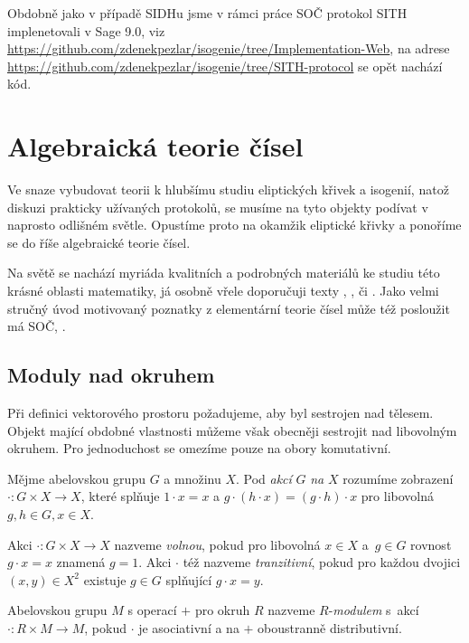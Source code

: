 \documentclass[12pt]{report}
\begin{document}
Obdobně jako v případě SIDHu jsme v rámci práce SOČ protokol SITH implenetovali v Sage 9.0, viz \url{https://github.com/zdenekpezlar/isogenie/tree/Implementation-Web}, na adrese \url{https://github.com/zdenekpezlar/isogenie/tree/SITH-protocol} se opět nachází kód.


\chapter{Algebraická teorie čísel}

Ve snaze vybudovat teorii k hlubšímu studiu eliptických křivek a isogenií, natož diskuzi prakticky užívaných protokolů, se musíme na tyto objekty podívat v naprosto odlišném světle. Opustíme proto na okamžik eliptické křivky a ponoříme se do říše algebraické teorie čísel.

Na světě se nachází myriáda kvalitních a podrobných materiálů ke studiu této krásné oblasti matematiky, já osobně vřele doporučuji texty \cite[Ch. XIII]{Chen}, \cite{Ireland}, \cite{Neukirch} či \cite{Pupik}. Jako velmi stručný úvod motivovaný poznatky z elementární teorie čísel může též posloužit má SOČ, \cite{Pezlar}. 

\section{Moduly nad okruhem}

Při definici vektorového prostoru požadujeme, aby byl sestrojen nad tělesem. Objekt mající obdobné vlastnosti můžeme však obecněji sestrojit nad libovolným okruhem. Pro jednoduchost se omezíme pouze na obory komutativní.

\begin{definice}
Mějme abelovskou grupu $G$ a množinu $X$. Pod \textit{akcí} $G$ \textit{na} $X$ rozumíme zobrazení $\cdot : G \times X \longrightarrow X$, které splňuje $1 \cdot x = x$ a $g \cdot (h \cdot x) = (g \cdot h) \cdot x$ pro libovolná $g,h \in G, x \in X$.
\end{definice}
\begin{definice}
Akci $\cdot : G \times X \longrightarrow X$ nazveme \textit{volnou}, pokud pro libovolná $x \in X$ a~$g \in G$ rovnost $g \cdot x = x$ znamená $g = 1$. Akci $\cdot$ též nazveme \textit{tranzitivní}, pokud pro každou dvojici $(x,y) \in X^2$ existuje $g \in G$ splňující $g \cdot x = y$.
\end{definice}

\begin{definice}
Abelovskou grupu $M$ s operací $+$ pro okruh $R$ nazveme $R$-\textit{modulem} s~akcí $\cdot : R \times M \longrightarrow M$, pokud $\cdot$ je asociativní a na $+$ oboustranně distributivní.
\end{definice}
\end{document}
